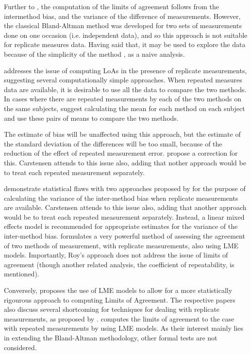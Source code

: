 \documentclass[12pt, a4paper]{report}
\theoremstyle{plain}
\theoremstyle{definition}
\theoremstyle{remark}
\begin{document}
Further to \citet{BA86}, the computation of the limits of agreement follows from the intermethod bias, and the variance of the difference of measurements. However, the classical Bland-Altman method was developed for two sets of measurements done on one occasion (i.e. independent data), and so this approach is not suitable for replicate measures data. Having said that, it may be used to explore the data because of the simplicity of the method , as a naive analysis.

\citet{BA99} addresses the issue of computing LoAs in the presence of replicate measurements, suggesting several computationally simple approaches. When repeated measures data are available, it is desirable to use all the data to compare the two methods. In cases where there are repeated measurements by each of the two methods on the same subjects, \citet{BA99} suggest calculating
the mean for each method on each subject and use these pairs of means to compare the two methods. 

The estimate of bias will be unaffected using this approach, but the estimate of the standard deviation of the differences will be too small, because of the reduction of the effect of repeated measurement error. \citet{BA99} propose a correction for this. Carstensen attends to this issue also, adding that nother approach would be to treat each repeated measurement separately.


\citet{BXC2008} demonstrate statistical flaws with two approaches proposed by \citet{BA99} for the purpose of calculating the variance of the inter-method bias when replicate measurements are available. Carstensen attends to this issue also, adding that another approach would be to treat each repeated measurement separately. Instead, a linear mixed effects model is recommended for appropriate estimates for the variance of the inter-method bias. 
\citet{ARoy2009} formulates a very powerful method of assessing the agreement of two methods of measurement, with replicate measurements, also using LME models. Importantly, Roy's approach does not address the issue of limits of agreement (though another related analysis, the coefficient of repeatability, is mentioned).

Conversely, \citet{BXC2008} proposes the use of LME models to allow for a more statistically rigourous approach to computing Limits of Agreement.  The respective papers also discuss several shortcoming for techniques for dealing with replicate measurements, as proposed by \citet{BA99}. \citet{BXC2008} computes the limits of agreement to the case with repeated measurements by using LME models. As their interest mainly lies in extending the Bland-Altman methodology, other formal tests are not considered.
\end{document}
